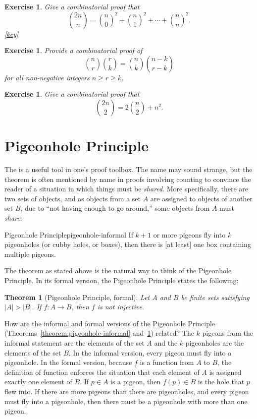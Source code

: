 \documentclass{book}
\newcounter{ekcounter}%
\theoremstyle{ekimcustom}
\newtheorem{theorem}[ekcounter]{Theorem}
\newtheorem{exercise}[ekcounter]{Exercise}
\newcommand\defn[1]{{\color{blue}{\bf #1}}}
\begin{document}
\begin{exercise}
Give a combinatorial proof that
\[ \binom{2n}{n} = \binom{n}{0}^2 + \binom{n}{1}^2 + \cdots + \binom{n}{n}^2.\]
\quad\quad\href{https://www.sharelatex.com/read/rcmbqrqjhpqc}{{\color{red}[key]}}
\end{exercise}

\begin{exercise}
Provide a combinatorial proof of
\[ \binom{n}{r}\binom{r}{k} = \binom{n}{k}\binom{n-k}{r-k}\]
for all non-negative integers $n \geq r \geq k$.
\end{exercise}

\begin{exercise}\label{exercise:one-variable-example-combinatorial-proof}
Give a combinatorial proof that
\[\binom{2n}{2}=2\binom{n}{2}+n^2.\]
\end{exercise}

\section{Pigeonhole Principle}

The \defn{Pigeonhole Principle} is a useful tool in one's proof toolbox. The name may sound strange, but the theorem is often mentioned by name in proofs involving counting to convince the reader of a situation in which things must be \emph{shared}. More specifically, there are two sets of objects, and as objects from a set $A$ are assigned to objects of another set $B$, due to ``not having enough to go around,'' some objects from $A$ must \emph{share}:
\begin{btheorem}{Pigeonhole Principle}{pigeonhole-informal}
If $k+1$ or more pigeons fly into $k$ pigeonholes (or cubby holes, or boxes), then there is [at least] one box containing multiple pigeons.
\end{btheorem}
The theorem as stated above is the natural way to think of the Pigeonhole Principle. In its formal version, the Pigeonhole Principle states the following:
\begin{theorem}[Pigeonhole Principle, formal]\label{theorem:pigeonhole-formal}
Let $A$ and $B$ be finite sets satisfying $|A|>|B|$. If $f : A \to B$, then $f$ is not injective.
\end{theorem}
How are the informal and formal versions of the Pigeonhole Principle (Theorems~\ref{theorem:pigeonhole-informal} and~\ref{theorem:pigeonhole-formal}) related? The $k$ pigeons from the informal statement are the elements of the set $A$ and the $k$ pigeonholes are the elements of the set $B$. In the informal version, every pigeon must fly into a pigeonhole. In the formal version, because $f$ is a function from $A$ to $B$, the definition of function enforces the situation that each element of $A$ is assigned exactly one element of $B$. If $p \in A$ is a pigeon, then $f(p) \in B$ is the hole that $p$ flew into. If there are more pigeons than there are pigeonholes, and every pigeon must fly into a pigeonhole, then there must be a pigeonhole with more than one pigeon.
\end{document}
